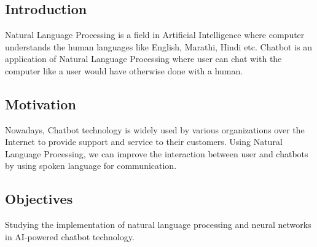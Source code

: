 \documentclass[12pt,a4paper]{report}     %
\begin{document}
\newpage
\pagestyle{fancy}							%
\renewcommand{\headrulewidth}{0.5pt}
\renewcommand{\footrulewidth}{0.5pt}		%
\chapter{}
\begin{normalsize}
			\noindent

\section{Introduction} 	
{\setlength{\baselineskip}{1.1\baselineskip}
Natural Language Processing is a field in Artificial Intelligence where computer understands the human languages like English, Marathi, Hindi etc. Chatbot is an application of Natural Language Processing where user can chat with the computer like a user would have otherwise done with a human.  
\par
}	
\section{Motivation}
{\setlength{\baselineskip}{1.1\baselineskip}
Nowadays, Chatbot technology is widely used by various organizations over the Internet to provide support and service to their customers. Using Natural Language Processing, we can improve the interaction between user and chatbots by using spoken language for communication.
\par}	

\section{Objectives}
{\setlength{\baselineskip}{1.1\baselineskip}
Studying the implementation of natural language processing and neural networks in AI-powered chatbot technology.

}
\end{normalsize}
\end{document}
